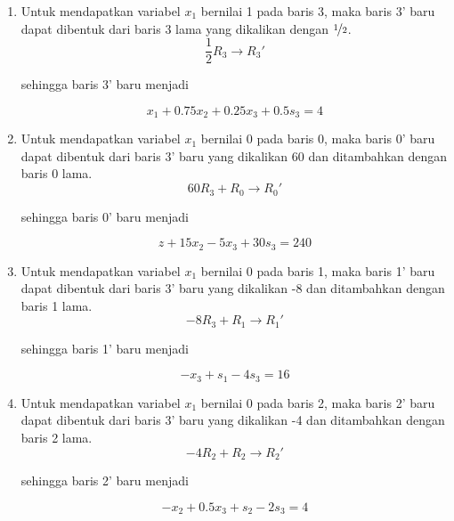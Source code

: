 \begin{enumerate}
	\item Untuk mendapatkan variabel \(x_1\) bernilai 1 pada baris 3, maka baris 3' baru dapat dibentuk dari baris 3 lama yang dikalikan dengan \(\nicefrac{1}{2}\).\\

	\begin{equation*}
		\frac{1}{2}R_3 \rightarrow R_3'
	\end{equation*}

	sehingga baris 3' baru menjadi

	\begin{equation*}
		x_1 + 0.75x_2 + 0.25x_3 + 0.5s_3 = 4
	\end{equation*}
	
	\item Untuk mendapatkan variabel \(x_1\) bernilai 0 pada baris 0, maka baris 0' baru dapat dibentuk dari baris 3' baru yang dikalikan 60 dan ditambahkan dengan baris 0 lama.\\

	\begin{equation*}
		60R_3 + R_0 \rightarrow R_0'
	\end{equation*}

	sehingga baris 0' baru menjadi

	\begin{equation*}
		z + 15x_2 - 5x_3 + 30s_3 = 240
	\end{equation*}

	\item Untuk mendapatkan variabel \(x_1\) bernilai 0 pada baris 1, maka baris 1' baru dapat dibentuk dari baris 3' baru yang dikalikan -8 dan ditambahkan dengan baris 1 lama.\\

	\begin{equation*}
		-8R_3 + R_1 \rightarrow R_1'
	\end{equation*}

	sehingga baris 1' baru menjadi

	\begin{equation*}
		-x_3 + s_1 - 4s_3 = 16
	\end{equation*}

	\item Untuk mendapatkan variabel \(x_1\) bernilai 0 pada baris 2, maka baris 2' baru dapat dibentuk dari baris 3' baru yang dikalikan -4 dan ditambahkan dengan baris 2 lama.\\

	\begin{equation*}
		-4R_2 + R_2 \rightarrow R_2'
	\end{equation*}

	sehingga baris 2' baru menjadi

	\begin{equation*}
		-x_2 + 0.5x_3 + s_2 - 2s_3 = 4
	\end{equation*}

\end{enumerate}

